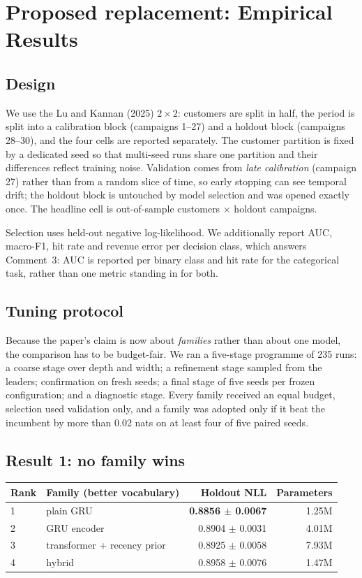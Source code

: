 \documentclass[11pt]{article}
\begin{document}
\section{Proposed replacement: Empirical Results}\label{sec:results}

\subsection*{Design}

We use the Lu and Kannan (2025) $2\times2$: customers are split in half, the
period is split into a calibration block (campaigns 1--27) and a holdout block
(campaigns 28--30), and the four cells are reported separately. The customer
partition is fixed by a dedicated seed so that multi-seed runs share one
partition and their differences reflect training noise. Validation comes from
\emph{late calibration} (campaign 27) rather than from a random slice of time,
so early stopping can see temporal drift; the holdout block is untouched by
model selection and was opened exactly once. The headline cell is out-of-sample
customers $\times$ holdout campaigns.

Selection uses held-out negative log-likelihood. We additionally report AUC,
macro-F1, hit rate and revenue error per decision class, which answers
Comment~3: AUC is reported per binary class and hit rate for the categorical
task, rather than one metric standing in for both.

\subsection*{Tuning protocol}

Because the paper's claim is now about \emph{families} rather than about one
model, the comparison has to be budget-fair. We ran a five-stage programme of
235 runs: a coarse stage over depth and width; a refinement stage sampled from
the leaders; confirmation on fresh seeds; a final stage of five seeds per frozen
configuration; and a diagnostic stage. Every family received an equal budget,
selection used validation only, and a family was adopted only if it beat the
incumbent by more than 0.02 nats on at least four of five paired seeds.

\subsection*{Result 1: no family wins}

\begin{center}\small
\begin{tabular}{llrr}
\toprule
Rank & Family (better vocabulary) & Holdout NLL & Parameters \\
\midrule
1 & plain GRU & \textbf{0.8856 $\pm$ 0.0067} & 1.25M \\
2 & GRU encoder & 0.8904 $\pm$ 0.0031 & 4.01M \\
3 & transformer + recency prior & 0.8925 $\pm$ 0.0058 & 7.93M \\
4 & hybrid & 0.8958 $\pm$ 0.0076 & 1.47M \\
\bottomrule
\end{tabular}
\end{center}
\end{document}

